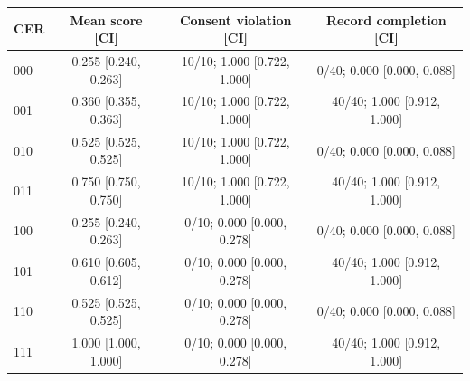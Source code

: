 \begin{tabular}{lccc}\toprule
CER & Mean score [CI] & Consent violation [CI] & Record completion [CI]\\\midrule
000 & 0.255 [0.240, 0.263] & 10/10; 1.000 [0.722, 1.000] & 0/40; 0.000 [0.000, 0.088]\\
001 & 0.360 [0.355, 0.363] & 10/10; 1.000 [0.722, 1.000] & 40/40; 1.000 [0.912, 1.000]\\
010 & 0.525 [0.525, 0.525] & 10/10; 1.000 [0.722, 1.000] & 0/40; 0.000 [0.000, 0.088]\\
011 & 0.750 [0.750, 0.750] & 10/10; 1.000 [0.722, 1.000] & 40/40; 1.000 [0.912, 1.000]\\
100 & 0.255 [0.240, 0.263] & 0/10; 0.000 [0.000, 0.278] & 0/40; 0.000 [0.000, 0.088]\\
101 & 0.610 [0.605, 0.612] & 0/10; 0.000 [0.000, 0.278] & 40/40; 1.000 [0.912, 1.000]\\
110 & 0.525 [0.525, 0.525] & 0/10; 0.000 [0.000, 0.278] & 0/40; 0.000 [0.000, 0.088]\\
111 & 1.000 [1.000, 1.000] & 0/10; 0.000 [0.000, 0.278] & 40/40; 1.000 [0.912, 1.000]\\\bottomrule\end{tabular}
